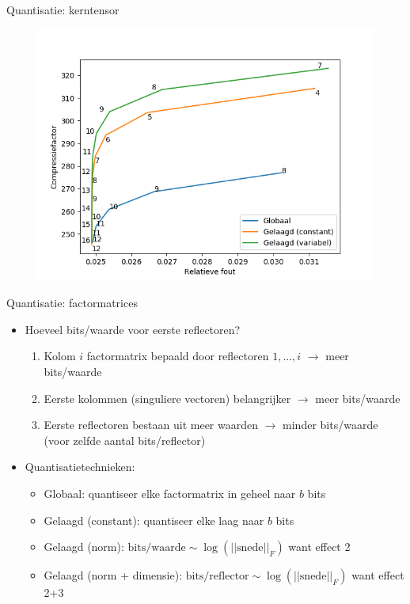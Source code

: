 \documentclass[t,12pt,dutch
\ifx\beamermode\undefined\else,\beamermode\fi
]{beamer}
\begin{document}
\begin{frame}{Quantisatie: kerntensor}

\begin{figure}[H]
\centering
\includegraphics[scale=0.5]{images/core_tensor_quantization_comparison.png}
\end{figure}

\end{frame}

\begin{frame}{Quantisatie: factormatrices}
\begin{itemize}
\item Hoeveel bits/waarde voor eerste reflectoren?
\begin{enumerate}
\item Kolom $i$ factormatrix bepaald door reflectoren $1, \dots, i$ $\rightarrow$ meer bits/waarde
\item Eerste kolommen (singuliere vectoren) belangrijker $\rightarrow$ meer bits/waarde
\item Eerste reflectoren bestaan uit meer waarden $\rightarrow$ minder bits/waarde (voor zelfde aantal bits/reflector)
\end{enumerate}
\item Quantisatietechnieken:
\begin{itemize}
\item Globaal: quantiseer elke factormatrix in geheel naar $b$ bits
\item Gelaagd (constant): quantiseer elke laag naar $b$ bits
\item Gelaagd (norm): $\text{bits/waarde} \sim \log{(||\text{snede}||_F)}$ want effect 2
\item Gelaagd (norm + dimensie): $\text{bits/reflector} \sim \log{(||\text{snede}||_F)}$ want effect 2+3
\end{itemize}
\end{itemize}
\end{frame}
\end{document}
